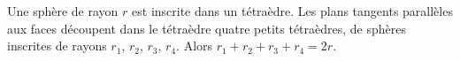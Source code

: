 Une sphère de rayon $r$ est inscrite dans un tétraèdre. Les plans tangents parallèles aux faces découpent dans le tétraèdre quatre petits tétraèdres, de sphères inscrites de rayons $r_1$, $r_2$, $r_3$, $r_4$. Alors $r_1 + r_2 + r_3 + r_4 = 2r$.
